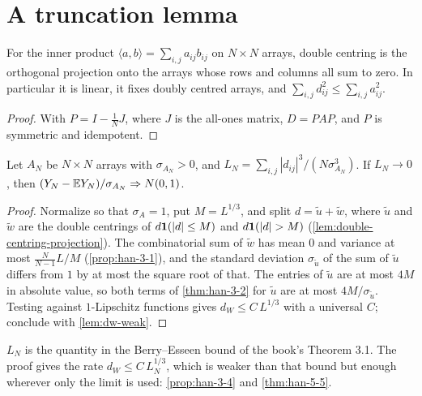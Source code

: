 \section{A truncation lemma}

\begin{lemma}
  \label{lem:double-centring-projection}
  For the inner product $\langle a,b\rangle=\sum_{i,j}a_{ij}b_{ij}$ on $N\times N$ arrays, double centring is the orthogonal projection onto the arrays whose rows and columns all sum to zero. In particular it is linear, it fixes doubly centred arrays, and $\sum_{i,j}d_{ij}^2\le\sum_{i,j}a_{ij}^2$.
\end{lemma}
\begin{proof}
  With $P=I-\frac1NJ$, where $J$ is the all-ones matrix, $D=PAP$, and $P$ is symmetric and idempotent.
\end{proof}

\begin{lemma}
  \label{lem:trunc-clt}
  Let $A_N$ be $N\times N$ arrays with $\sigma_{A_N}>0$, and $L_N=\sum_{i,j}|d_{ij}|^3/(N\sigma_{A_N}^3)$. If $L_N\to0$, then $(Y_N-\mathbb{E} Y_N)/\sigma_{A_N}\Rightarrow N(0,1)$.
\end{lemma}
\begin{proof}
  Normalize so that $\sigma_A=1$, put $M=L^{1/3}$, and split $d=\tilde u+\tilde w$, where $\tilde u$ and $\tilde w$ are the double centrings of $d\mathbf{1}(|d|\le M)$ and $d\ind(|d|>M)$ (\cref{lem:double-centring-projection}).
  The combinatorial sum of $\tilde w$ has mean $0$ and variance at most $\frac N{N-1}L/M$ (\cref{prop:han-3-1}), and the standard deviation $\sigma_{\tilde u}$ of the sum of $\tilde u$ differs from $1$ by at most the square root of that.
  The entries of $\tilde u$ are at most $4M$ in absolute value, so both terms of \cref{thm:han-3-2} for $\tilde u$ are at most $4M/\sigma_{\tilde u}$.
  Testing against $1$-Lipschitz functions gives $d_W\le C\,L^{1/3}$ with a universal $C$; conclude with \cref{lem:dw-weak}.
\end{proof}
\begin{remark}
  $L_N$ is the quantity in the Berry--Esseen bound of the book's Theorem 3.1. The proof gives the rate $d_W\le C\,L_N^{1/3}$, which is weaker than that bound but enough wherever only the limit is used: \cref{prop:han-3-4} and \cref{thm:han-5-5}.
\end{remark}

